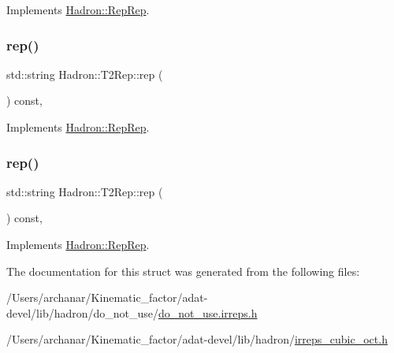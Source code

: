 Implements \mbox{\hyperlink{structHadron_1_1RepRep_ab3213025f6de249f7095892109575fde}{Hadron\+::\+Rep\+Rep}}.

\mbox{\label{structHadron_1_1T2Rep_aa8debf402fc347d71fe8ba6745578c0d}} 
\subsubsection{\texorpdfstring{rep()}{rep()}\hspace{0.1cm}{\footnotesize\ttfamily [4/5]}}
{\footnotesize\ttfamily std\+::string Hadron\+::\+T2\+Rep\+::rep (\begin{DoxyParamCaption}{ }\end{DoxyParamCaption}) const\hspace{0.3cm}{\ttfamily [inline]}, {\ttfamily [virtual]}}



Implements \mbox{\hyperlink{structHadron_1_1RepRep_ab3213025f6de249f7095892109575fde}{Hadron\+::\+Rep\+Rep}}.

\mbox{\label{structHadron_1_1T2Rep_aa8debf402fc347d71fe8ba6745578c0d}} 
\subsubsection{\texorpdfstring{rep()}{rep()}\hspace{0.1cm}{\footnotesize\ttfamily [5/5]}}
{\footnotesize\ttfamily std\+::string Hadron\+::\+T2\+Rep\+::rep (\begin{DoxyParamCaption}{ }\end{DoxyParamCaption}) const\hspace{0.3cm}{\ttfamily [inline]}, {\ttfamily [virtual]}}



Implements \mbox{\hyperlink{structHadron_1_1RepRep_ab3213025f6de249f7095892109575fde}{Hadron\+::\+Rep\+Rep}}.



The documentation for this struct was generated from the following files\+:\begin{DoxyCompactItemize}
\item 
/\+Users/archanar/\+Kinematic\+\_\+factor/adat-\/devel/lib/hadron/do\+\_\+not\+\_\+use/\mbox{\hyperlink{adat-devel_2lib_2hadron_2do__not__use_2do__not__use_8irreps_8h}{do\+\_\+not\+\_\+use.\+irreps.\+h}}\item 
/\+Users/archanar/\+Kinematic\+\_\+factor/adat-\/devel/lib/hadron/\mbox{\hyperlink{adat-devel_2lib_2hadron_2irreps__cubic__oct_8h}{irreps\+\_\+cubic\+\_\+oct.\+h}}\end{DoxyCompactItemize}
